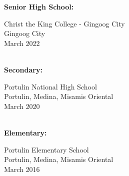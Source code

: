 {\begin{tabbing}
{\bf Senior High School:} \> \parbox[t]{3.5in}{Christ the King College - Gingoog City \\
                             Gingoog City \\
                             March 2022} \\[18pt]


{\bf Secondary:} \> \parbox[t]{3.5in}{Portulin National High School \\
                   Portulin, Medina, Misamis Oriental \\
                   March 2020} \\[18pt]


{\bf Elementary:} \> \parbox[t]{3.5in}{Portulin Elementary School \\
                    Portulin, Medina, Misamis Oriental \\
                    March 2016} \\
\end{tabbing}
}



